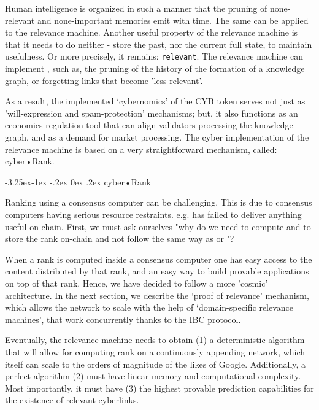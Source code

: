 \documentclass[8pt,oneside]{amsart}
\makeatletter
\newcommand{\linkgreen}[2]{\href{#1}{\color{green}{#2}}}
\renewcommand\subsection{\@startsection{subsection}{2}{\z@}%
                                     {-3.25ex\@plus -1ex \@minus -.2ex}%
                                     {0ex \@plus .2ex}%
                                     {\play\Large}}%
\newcommand{\titleSection}[1]{\subsection{#1}}
\newcommand{\code}[1]{{\PlayBold #1}}
\makeatother
\begin{document}
\begin{Abstract}
Human intelligence is organized in such a manner that the pruning of none-relevant and none-important memories emit with time. The same can be applied to the relevance machine. Another useful property of the relevance machine is that it needs to do neither - store the past, nor the current full state, to maintain usefulness. Or more precisely, it remains: \verb|relevant|. The relevance machine can implement \linkgreen{https://ipfs.io/ipfs/QmP81EcuNDZHQutvdcDjbQEqiTYUzU315aYaTyrVj6gtJb}{aggressive pruning strategies}, such as, the pruning of the history of the formation of a knowledge graph, or forgetting links that become 'less relevant'.

As a result, the implemented ‘cybernomics’ of the CYB token serves not just as 'will-expression and spam-protection' mechanisms; but, it also functions as an economics regulation tool that can align validators processing the knowledge graph, and as a demand for market processing. The \code{cyber} implementation of the relevance machine is based on a very straightforward mechanism, called: cyber•Rank.

\titleSection{cyber•Rank}\label{cyberRank}

Ranking using a consensus computer can be challenging. This is due to consensus computers having serious resource restraints. e.g. \linkgreen{https://ipfs.io/ipfs/QmWTZjDZNbBqcJ5b6VhWGXBQ5EQavKKDteHsdoYqB5CBjh}{Nebulas} has failed to deliver anything useful on-chain. First, we must ask ourselves "why do we need to compute and to store the rank on-chain and not follow the same way as \linkgreen{https://ipfs.io/ipfs/QmZo7eY5UdJYotf3Z9GNVBGLjkCnE1j2fMdW2PgGCmvGPj}{Colony} or \linkgreen{https://ipfs.io/ipfs/QmTrxXp2xhB2zWGxhNoLgsztevqKLwpy5HwKjLjzFa7rnD}{Truebit}"?

When a rank is computed inside a consensus computer one has easy access to the content distributed by that rank, and an easy way to build provable applications on top of that rank. Hence, we have decided to follow a more 'cosmic' architecture. In the next section, we describe the ‘proof of relevance’ mechanism, which allows the network to scale with the help of ‘domain-specific relevance machines’, that work concurrently thanks to the IBC protocol.

Eventually, the relevance machine needs to obtain (1) a deterministic algorithm that will allow for computing rank on a continuously appending network, which itself can scale to the orders of magnitude of the likes of Google. Additionally, a perfect algorithm (2) must have linear memory and computational complexity. Most importantly, it must have (3) the highest provable prediction capabilities for the existence of relevant cyberlinks.


\end{Abstract}
\end{document}
